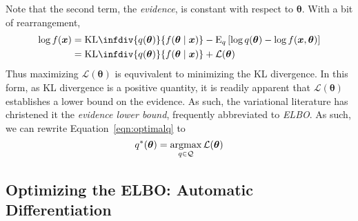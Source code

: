     Note that the second term, the \emph{evidence}, is constant with respect to 
    $\bm{\theta}$.  With a bit of rearrangement,
    \[
        \begin{aligned}
        \log f(\bm{x}) 
            &= \text{KL}\infdiv{q(\bm{\theta})}{f(\bm{\theta}\mid\bm{x})}
                - \text{E}_q\left[
                \log q(\bm{\theta}) - \log f(\bm{x},\bm{\theta})
                \right]\\
            &= \text{KL}\infdiv{q(\bm{\theta})}{f(\bm{\theta}\mid\bm{x})}
                + \mathcal{L}(\bm{\theta})
        \end{aligned}
    \]
    Thus maximizing $\mathcal{L}(\bm{\theta})$ is equvivalent to minimizing the 
    KL divergence. In this form, as KL divergence is a positive quantity, it is
    readily apparent that $\mathcal{L}(\bm{\theta})$ establishes a lower bound
    on the evidence.  As such, the variational literature has christened it the
    \emph{evidence lower bound}, frequently abbreviated to \emph{ELBO}.  As such,
    we can rewrite Equation~\eqref{eqn:optimalq} to
    \[
        q^*(\bm{\theta}) = \operatorname*{argmax}_{q\in\mathcal{Q}} \mathcal{L}(\bm{\theta})
    \]
    
\subsection{Optimizing the ELBO: Automatic Differentiation}